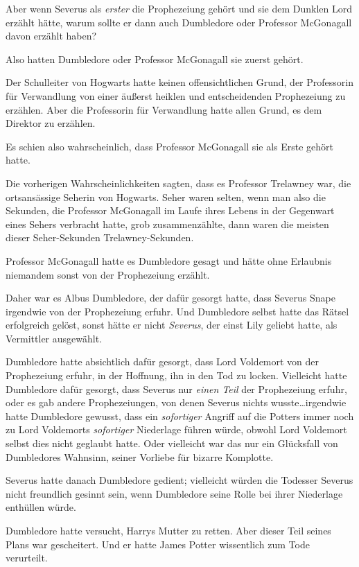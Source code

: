 {Aber wenn Severus als \emph{erster} die Prophezeiung gehört und sie dem Dunklen Lord erzählt hätte, warum sollte er dann auch Dumbledore oder Professor McGonagall davon erzählt haben?

Also hatten Dumbledore oder Professor McGonagall sie zuerst gehört.

Der Schulleiter von Hogwarts hatte keinen offensichtlichen Grund, der Professorin für Verwandlung von einer äußerst heiklen und entscheidenden Prophezeiung zu erzählen. Aber die Professorin für Verwandlung hatte allen Grund, es dem Direktor zu erzählen.

Es schien also wahrscheinlich, dass Professor McGonagall sie als Erste gehört hatte.

Die vorherigen Wahrscheinlichkeiten sagten, dass es Professor Trelawney war, die ortsansässige Seherin von Hogwarts. Seher waren selten, wenn man also die Sekunden, die Professor McGonagall im Laufe ihres Lebens in der Gegenwart eines Sehers verbracht hatte, grob zusammenzählte, dann waren die meisten dieser Seher-Sekunden Trelawney-Sekunden.

Professor McGonagall hatte es Dumbledore gesagt und hätte ohne Erlaubnis niemandem sonst von der Prophezeiung erzählt.

Daher war es Albus Dumbledore, der dafür gesorgt hatte, dass Severus Snape irgendwie von der Prophezeiung erfuhr. Und Dumbledore selbst hatte das Rätsel erfolgreich gelöst, sonst hätte er nicht \emph{Severus}, der einst Lily geliebt hatte, als Vermittler ausgewählt.

Dumbledore hatte absichtlich dafür gesorgt, dass Lord Voldemort von der Prophezeiung erfuhr, in der Hoffnung, ihn in den Tod zu locken. Vielleicht hatte Dumbledore dafür gesorgt, dass Severus nur \emph{einen Teil} der Prophezeiung erfuhr, oder es gab andere Prophezeiungen, von denen Severus nichts wusste…irgendwie hatte Dumbledore gewusst, dass ein \emph{sofortiger} Angriff auf die Potters immer noch zu Lord Voldemorts \emph{sofortiger} Niederlage führen würde, obwohl Lord Voldemort selbst dies nicht geglaubt hatte. Oder vielleicht war das nur ein Glücksfall von Dumbledores Wahnsinn, seiner Vorliebe für bizarre Komplotte.

Severus hatte danach Dumbledore gedient; vielleicht würden die Todesser Severus nicht freundlich gesinnt sein, wenn Dumbledore seine Rolle bei ihrer Niederlage enthüllen würde.

Dumbledore hatte versucht, Harrys Mutter zu retten. Aber dieser Teil seines Plans war gescheitert. Und er hatte James Potter wissentlich zum Tode verurteilt.

}
